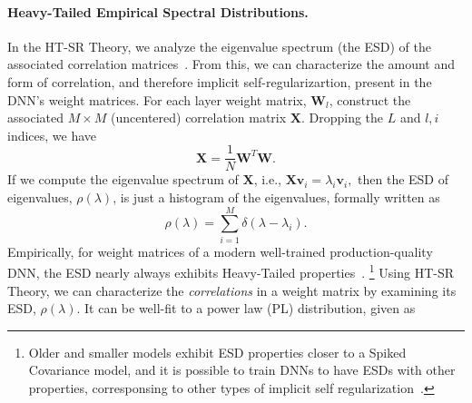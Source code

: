 \paragraph{Heavy-Tailed Empirical Spectral Distributions.}
%
%
In the HT-SR Theory, we analyze the eigenvalue spectrum (the ESD) of the associated correlation matrices~\cite{MM18_TR}.
From this, we can characterize the amount and form of correlation, and therefore implicit self-regularizartion, present in the DNN's weight matrices.
For each layer weight matrix, $\mathbf{W}_{l}$, construct the associated $M\times M$ (uncentered) correlation matrix $\mathbf{X}$. 
Dropping the $L$ and $l,i$ indices, we have
$$
\mathbf{X} = \frac{1}{N}\mathbf{W}^{T}\mathbf{W}.
$$
%
If we compute the eigenvalue spectrum of $\mathbf{X}$, i.e.,
$  %
\mathbf{X}\mathbf{v}_{i}=\lambda_{i}\mathbf{v}_{i} , 
$  %
then the ESD of eigenvalues, $\rho(\lambda)$, is just a histogram of the eigenvalues, formally written as
\begin{equation}
\rho(\lambda)=\sum\limits_{i=1}^{M}\delta(\lambda-\lambda_{i})  .
\label{eqn:eigenval_hist}
\end{equation}
%
Empirically, for weight matrices of a modern well-trained production-quality DNN, the ESD nearly always exhibits Heavy-Tailed properties~\cite{MM18_TR}.%
\footnote{Older and smaller models exhibit ESD properties closer to a Spiked Covariance model, and it is possible to train DNNs to have ESDs with other properties, corresponsing to other types of implicit self regularization~\cite{MM18_TR}.} 
Using HT-SR Theory, we can characterize the \emph{correlations} in a weight matrix by examining its ESD, $\rho(\lambda)$.
It can be well-fit to a power law (PL) distribution, given as
